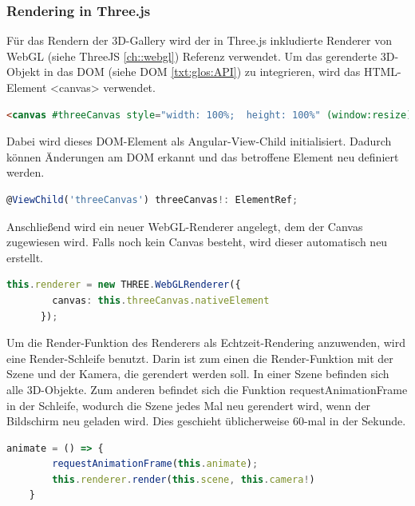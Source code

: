 \subsubsection{Rendering in Three.js}
Für das Rendern der 3D-Gallery wird der in Three.js inkludierte Renderer von WebGL (siehe ThreeJS \ref{ch::webgl}) Referenz verwendet. Um das gerenderte 3D-Objekt in das DOM (siehe DOM \ref{txt:glos:API}) zu integrieren, wird das HTML-Element <canvas> verwendet. \cite{ThreejsWebGLRenderer}

\begin{lstlisting}[caption={Canvas-Element in HTML},language=HTML,label=lst:impl:canvas]
    <canvas #threeCanvas style="width: 100%;  height: 100%" (window:resize)="onResize($event)"></canvas>
\end{lstlisting}
Dabei wird dieses DOM-Element als Angular-View-Child initialisiert. Dadurch können Änderungen am DOM erkannt und das betroffene Element neu definiert werden. \cite{AngularViewChild}
\begin{lstlisting}[caption={Canvas als View-Child initialisieren},language=TypeScript,label=lst:impl:viewchild]
    @ViewChild('threeCanvas') threeCanvas!: ElementRef;
\end{lstlisting}
Anschließend wird ein neuer WebGL-Renderer angelegt, dem der Canvas zugewiesen wird. Falls noch kein Canvas besteht, wird dieser automatisch neu erstellt. \cite{ThreejsWebGLRenderer}
\begin{lstlisting}[caption={WebGlRenderer anlegen},language=TypeScript,label=lst:impl:WebGlRenderer]
    this.renderer = new THREE.WebGLRenderer({
        canvas: this.threeCanvas.nativeElement
      });
\end{lstlisting}
Um die Render-Funktion des Renderers als Echtzeit-Rendering anzuwenden, wird eine Render-Schleife benutzt. Darin ist zum einen die Render-Funktion mit der Szene und der Kamera, die gerendert werden soll. In einer Szene befinden sich alle 3D-Objekte. Zum anderen befindet sich die Funktion requestAnimationFrame in der Schleife, wodurch die Szene jedes Mal neu gerendert wird, wenn der Bildschirm neu geladen wird. Dies geschieht üblicherweise 60-mal in der Sekunde. \cite{ThreejsCreateAScene}
\begin{lstlisting}[caption={Animations-Schleife},language=TypeScript,label=lst:impl:animationloop]
    animate = () => {
        requestAnimationFrame(this.animate);
        this.renderer.render(this.scene, this.camera!)
    }  
\end{lstlisting}

